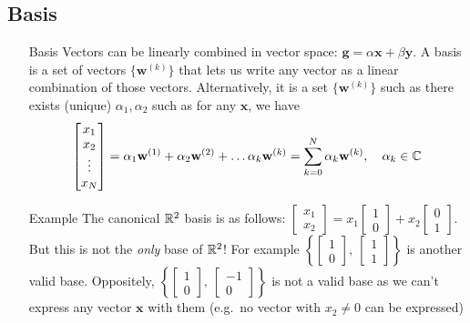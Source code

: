 \documentclass[11pt,a4paper]{article}
\begin{document}
\subsection{Basis}
\begin{itemize}
    \item[Basis]Vectors can be linearly combined in vector space: $\mathbf{g} = \alpha \mathbf{x} + \beta \mathbf{y}$. A basis is a set of vectors $\{\mathbf{w}^{(k)}\}$ that lets us write any vector as a linear combination of those vectors. Alternatively, it is a set $\{\mathbf{w}^{(k)}\}$ such as there exists (unique) $\alpha_1,\alpha_2$ such as for any $\mathbf{x}$, we have \begin{equation}
        \begin{bmatrix}
            x_1\\x_2\\\vdots\\x_N
        \end{bmatrix} 
        =\alpha_1 \mathbf{w}^{(1)} + \alpha_2 \mathbf{w}^{(2)} + \ldots \alpha_k \mathbf{w}^{(k)}= \somme{N}{k=0}\alpha_k \mathbf{w}^{(k)},\quad \alpha_k \in \C%
        \label{equ_basis}
\end{equation}
    \item[Example]The canonical $\mathbb{R}^2$ basis is as follows: 
    $\begin{bmatrix}
        x_1\\x_2
    \end{bmatrix} =
    x_1 \begin{bmatrix}
        1\\0
    \end{bmatrix} + 
    x_2
    \begin{bmatrix}
    0\\1
\end{bmatrix}$. But this is not the \textit{only} base of $\mathbb{R}^2$! For example $\left\{\begin{bmatrix}
    1\\0
\end{bmatrix},\ \begin{bmatrix}
    1\\1
\end{bmatrix}\right\}$ is another valid base. Oppositely, $\left\{\begin{bmatrix}
    1\\0
\end{bmatrix},\ \begin{bmatrix}
    -1\\0
\end{bmatrix}\right\}$ is not a valid base as we can't express any vector $\mathbf{x}$ with them (e.g.\ no vector with $x_2 \neq 0$ can be expressed)

\end{itemize}
\end{document}
